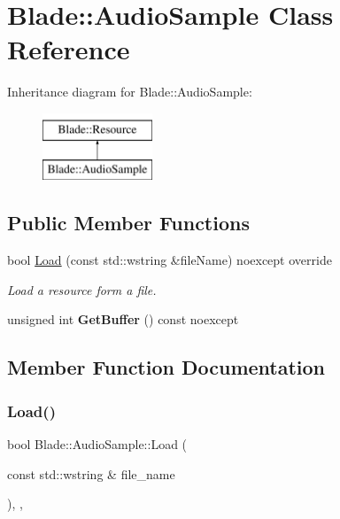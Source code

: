 \hypertarget{class_blade_1_1_audio_sample}{}\section{Blade\+:\+:Audio\+Sample Class Reference}
\label{class_blade_1_1_audio_sample}
Inheritance diagram for Blade\+:\+:Audio\+Sample\+:\begin{figure}[H]
\begin{center}
\leavevmode
\includegraphics[height=2.000000cm]{class_blade_1_1_audio_sample}
\end{center}
\end{figure}
\subsection*{Public Member Functions}
\begin{DoxyCompactItemize}
\item 
bool \hyperlink{class_blade_1_1_audio_sample_a27bc4a11067251a2c820f1e3096bb812}{Load} (const std\+::wstring \&file\+Name) noexcept override
\begin{DoxyCompactList}\small\item\em Load a resource form a file. \end{DoxyCompactList}\item 
\mbox{\label{class_blade_1_1_audio_sample_aa3d39cda7e85c59924022e17272dbb26}} 
unsigned int {\bfseries Get\+Buffer} () const noexcept
\end{DoxyCompactItemize}


\subsection{Member Function Documentation}
\mbox{\label{class_blade_1_1_audio_sample_a27bc4a11067251a2c820f1e3096bb812}} 
\subsubsection{\texorpdfstring{Load()}{Load()}}
{\footnotesize\ttfamily bool Blade\+::\+Audio\+Sample\+::\+Load (\begin{DoxyParamCaption}\item[{const std\+::wstring \&}]{file\+\_\+name }\end{DoxyParamCaption})\hspace{0.3cm}{\ttfamily [override]}, {\ttfamily [virtual]}, {\ttfamily [noexcept]}}



